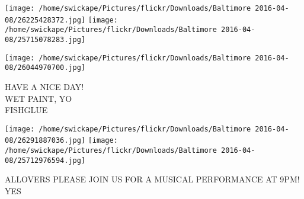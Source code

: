 \documentclass[10pt,letterpaper]{article}
\begin{document}
\texttt{[image: /home/swickape/Pictures/flickr/Downloads/Baltimore 2016-04-08/26225428372.jpg]}
\texttt{[image: /home/swickape/Pictures/flickr/Downloads/Baltimore 2016-04-08/25715078283.jpg]}

\vspace{0.25in}
\texttt{[image: /home/swickape/Pictures/flickr/Downloads/Baltimore 2016-04-08/26044970700.jpg]}

HAVE A NICE DAY!\\
WET PAINT, YO\\
FISHGLUE
\pagebreak

\texttt{[image: /home/swickape/Pictures/flickr/Downloads/Baltimore 2016-04-08/26291887036.jpg]}
\texttt{[image: /home/swickape/Pictures/flickr/Downloads/Baltimore 2016-04-08/25712976594.jpg]}

ALLOVERS PLEASE JOIN US FOR A MUSICAL PERFORMANCE AT 9PM!\\
YES
\pagebreak
\end{document}
